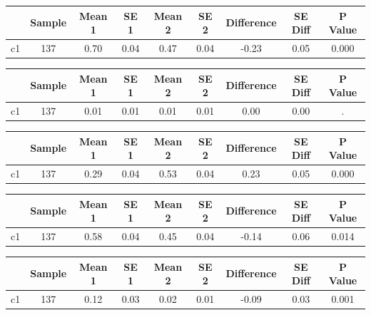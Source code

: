 {
\def\sym#1{\ifmmode^{#1}\else\(^{#1}\)\fi}
\begin{tabular}{l*{1}{cccccccc}}
\hline\hline
            &      Sample&      Mean 1&        SE 1&      Mean 2&        SE 2&  Difference&     SE Diff&     P Value\\
\hline
c1          &         137&        0.70&        0.04&        0.47&        0.04&       -0.23&        0.05&       0.000\\
\hline\hline
\end{tabular}
}
{
\def\sym#1{\ifmmode^{#1}\else\(^{#1}\)\fi}
\begin{tabular}{l*{1}{cccccccc}}
\hline\hline
            &      Sample&      Mean 1&        SE 1&      Mean 2&        SE 2&  Difference&     SE Diff&     P Value\\
\hline
c1          &         137&        0.01&        0.01&        0.01&        0.01&        0.00&        0.00&           .\\
\hline\hline
\end{tabular}
}
{
\def\sym#1{\ifmmode^{#1}\else\(^{#1}\)\fi}
\begin{tabular}{l*{1}{cccccccc}}
\hline\hline
            &      Sample&      Mean 1&        SE 1&      Mean 2&        SE 2&  Difference&     SE Diff&     P Value\\
\hline
c1          &         137&        0.29&        0.04&        0.53&        0.04&        0.23&        0.05&       0.000\\
\hline\hline
\end{tabular}
}
{
\def\sym#1{\ifmmode^{#1}\else\(^{#1}\)\fi}
\begin{tabular}{l*{1}{cccccccc}}
\hline\hline
            &      Sample&      Mean 1&        SE 1&      Mean 2&        SE 2&  Difference&     SE Diff&     P Value\\
\hline
c1          &         137&        0.58&        0.04&        0.45&        0.04&       -0.14&        0.06&       0.014\\
\hline\hline
\end{tabular}
}
{
\def\sym#1{\ifmmode^{#1}\else\(^{#1}\)\fi}
\begin{tabular}{l*{1}{cccccccc}}
\hline\hline
            &      Sample&      Mean 1&        SE 1&      Mean 2&        SE 2&  Difference&     SE Diff&     P Value\\
\hline
c1          &         137&        0.12&        0.03&        0.02&        0.01&       -0.09&        0.03&       0.001\\
\hline\hline
\end{tabular}
}
